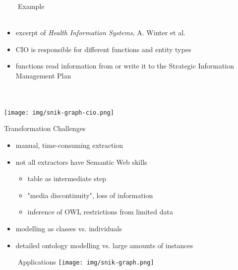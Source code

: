 \documentclass[aspectratio=1610,12pt]{beamer}
\newcommand{\imageslide}[4][]
{
\newgeometry{margin=0cm,top=1em}
\begin{frame}[plain]{~~~~#2}
\vspace{0.2em}
\centering\texttt{[image: \#3]}
\\#1
\note{#4}
\end{frame}
\restoregeometry
}
\begin{document}


\begin{frame}[plain]{~~~~Example}
~\\~\\
\begin{itemize}
\item excerpt of \emph{Health Information Systems}, A. Winter et al.
\item CIO is responsible for different functions and entity types
\item functions read information from or write it to the Strategic Information Management Plan
\end{itemize}
~\\~\\
\centering\texttt{[image: img/snik-graph-cio.png]}
\end{frame}
\restoregeometry


\begin{frame}{Transformation Challenges}
\begin{itemize}
\item manual, time-consuming extraction
\item not all extractors have Semantic Web skills 
\begin{itemize}
\item table as intermediate step
\item "media discontinuity", loss of information
\item inference of OWL restrictions from limited data 
\end{itemize}
\item modelling as classes vs. individuals
\item detailed ontology modelling vs. large amounts of instances 
\end{itemize}
\end{frame}




\begin{frame}[plain]{~~~~Applications}
\centering\texttt{[image: img/snik-graph.png]}
\end{frame}
\restoregeometry
\end{document}

